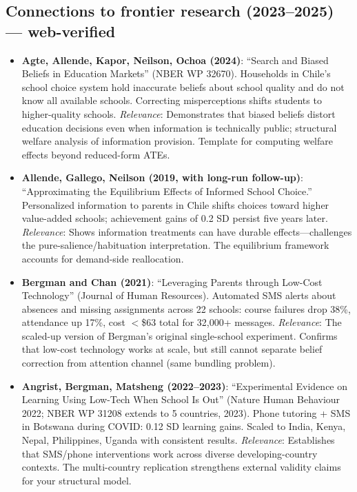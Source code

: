 \documentclass[11pt]{article}
\begin{document}
\subsection{Connections to frontier research (2023--2025) --- web-verified}

\begin{itemize}
  \item \textbf{Agte, Allende, Kapor, Neilson, Ochoa (2024)}: ``Search and Biased Beliefs in Education Markets'' (NBER WP 32670). Households in Chile's school choice system hold inaccurate beliefs about school quality and do not know all available schools. Correcting misperceptions shifts students to higher-quality schools. \emph{Relevance}: Demonstrates that biased beliefs distort education decisions even when information is technically public; structural welfare analysis of information provision. Template for computing welfare effects beyond reduced-form ATEs.

  \item \textbf{Allende, Gallego, Neilson (2019, with long-run follow-up)}: ``Approximating the Equilibrium Effects of Informed School Choice.'' Personalized information to parents in Chile shifts choices toward higher value-added schools; achievement gains of 0.2 SD persist five years later. \emph{Relevance}: Shows information treatments can have durable effects---challenges the pure-salience/habituation interpretation. The equilibrium framework accounts for demand-side reallocation.

  \item \textbf{Bergman and Chan (2021)}: ``Leveraging Parents through Low-Cost Technology'' (Journal of Human Resources). Automated SMS alerts about absences and missing assignments across 22 schools: course failures drop 38\%, attendance up 17\%, cost $<$\$63 total for 32,000+ messages. \emph{Relevance}: The scaled-up version of Bergman's original single-school experiment. Confirms that low-cost technology works at scale, but still cannot separate belief correction from attention channel (same bundling problem).

  \item \textbf{Angrist, Bergman, Matsheng (2022--2023)}: ``Experimental Evidence on Learning Using Low-Tech When School Is Out'' (Nature Human Behaviour 2022; NBER WP 31208 extends to 5 countries, 2023). Phone tutoring + SMS in Botswana during COVID: 0.12 SD learning gains. Scaled to India, Kenya, Nepal, Philippines, Uganda with consistent results. \emph{Relevance}: Establishes that SMS/phone interventions work across diverse developing-country contexts. The multi-country replication strengthens external validity claims for your structural model.


\end{itemize}
\end{document}
